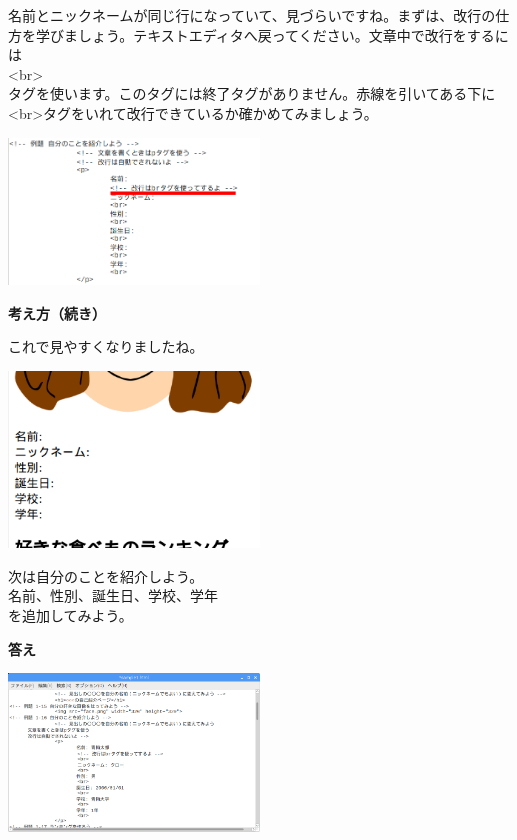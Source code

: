 \documentclass[a4paper,12pt]{jarticle}
\begin{document}
\bigskip

\flushleft
名前とニックネームが同じ行になっていて、見づらいですね。まずは、改行の仕方を学びましょう。テキストエディタへ戻ってください。文章中で改行をするには\\
{\textless}br{\textgreater} \ \ \ \ \ \\
タグを使います。このタグには終了タグがありません。赤線を引いてある下に{\textless}br{\textgreater}タグをいれて改行できているか確かめてみましょう。


\includegraphics[width=0.5\textwidth]{textbook-img174.png}

\clearpage
\flushleft

\textbf{考え方（続き）}


これで見やすくなりましたね。

\bigskip


\includegraphics[width=0.5\textwidth]{textbook-img176.png}

\bigskip

次は自分のことを紹介しよう。\\
名前、性別、誕生日、学校、学年\\
を追加してみよう。



\bigskip

\bigskip


\textbf{答え}


\bigskip

\includegraphics[width=0.5\textwidth]{textbook-img177.png}
\end{document}

